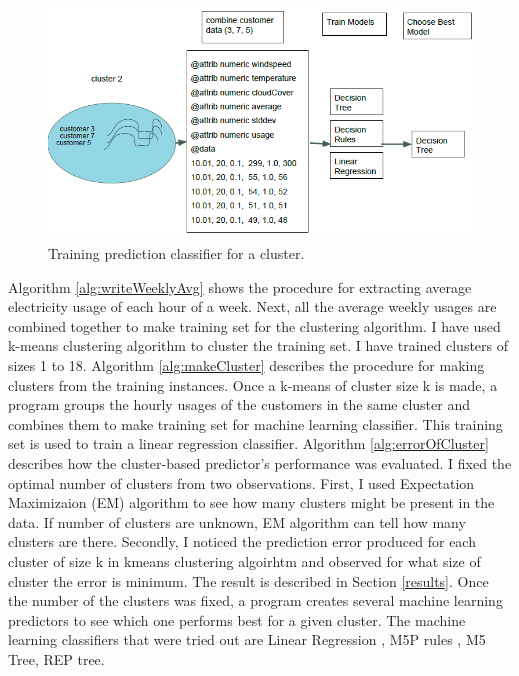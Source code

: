 \begin{figure}[h!]
  \includegraphics[width=\linewidth]{cluster-toy-2.png}
  \caption{Training prediction classifier for a cluster.}
  \label{fig:toy-clust-2}
\end{figure}

Algorithm \ref{alg:writeWeeklyAvg} shows the procedure for extracting average electricity usage of each hour of a week. Next, all the average weekly usages are combined together to make training set for the clustering algorithm. I have used k-means \cite{witten2005data} clustering algorithm to cluster the  training set. I have trained clusters of sizes 1 to 18. Algorithm \ref{alg:makeCluster} describes the procedure for making clusters from the training instances. Once a k-means of cluster size k is made, a program groups the hourly usages of the customers in the same cluster and combines them to make training set for  machine learning classifier. This training set is used to train a  linear regression classifier. Algorithm \ref{alg:errorOfCluster} describes how the cluster-based predictor's performance was evaluated. I fixed the optimal number of clusters from two observations. First, I used Expectation Maximizaion (EM) algorithm to see how many clusters might be present in the data. If number of clusters are unknown, EM algorithm can tell how many clusters are there. Secondly, I noticed the prediction error produced for each cluster of size k in kmeans clustering algoirhtm and observed for what size of cluster the error is minimum. The result is described in Section \ref{results}. Once the number of the clusters was fixed, a program creates several machine learning predictors to see which one performs best for a given cluster. The machine learning classifiers that were tried out are Linear Regression \cite{witten2005data}, M5P rules \cite{witten2005data}, M5 Tree\cite{witten2005data}, REP tree\cite{witten2005data}. 

